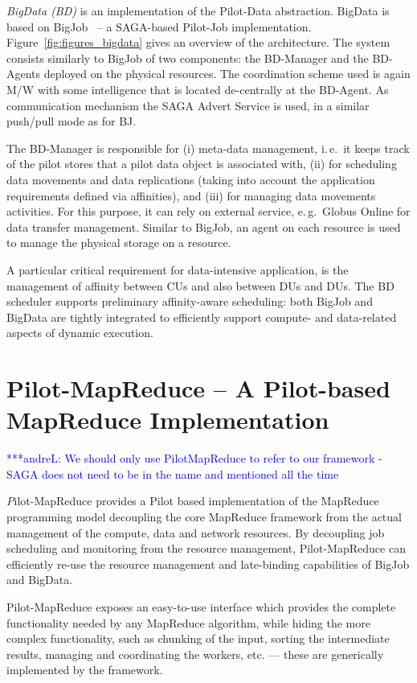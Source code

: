 \documentclass{acm_proc_article-sp}
\newcommand{\alnote}[1]{ {\textcolor{blue} { ***andreL: #1 }}}
\newcommand{\alnote}[1]{}
\newcommand{\pilot}{Pilot\xspace}
\newcommand{\pilotmapreduce}{Pilot-MapReduce\xspace}
\begin{document}
{\it BigData (BD)} is an implementation of the Pilot-Data abstraction.
BigData is based on BigJob~\cite{bigjob_web} -- a SAGA-based Pilot-Job
implementation. Figure~\ref{fig:figures_bigdata} gives an overview of the
architecture. The system consists similarly to BigJob of two components: the
BD-Manager and the BD-Agents deployed on the physical resources. The
coordination scheme used is again M/W with some intelligence that is located
de-centrally at the BD-Agent. As communication mechanism the SAGA Advert
Service is used, in a similar push/pull mode as for BJ.

The BD-Manager is responsible for (i) meta-data management, i.\,e.\ it
keeps track of the pilot stores that a pilot data object is associated
with, (ii) for scheduling data movements and data replications (taking
into account the application requirements defined via affinities), and
(iii) for managing data movements activities. For this purpose, it can rely
on external service, e.\,g.\ Globus Online for data transfer management.  
Similar to BigJob, an agent on each resource is used to manage the physical 
storage on a resource.  

A particular critical requirement for data-intensive application, is
the management of affinity between CUs and also between DUs and
DUs. The BD scheduler supports preliminary affinity-aware
scheduling: both BigJob and BigData are tightly integrated to
efficiently support compute- and data-related aspects of dynamic
execution.


\section{Pilot-MapReduce -- A Pilot-based MapReduce Implementation}
\alnote{We should only use PilotMapReduce to refer to our framework - SAGA does not need to be in the name and mentioned all the time}


{\emph \pilotmapreduce} provides a \pilot based implementation of the 
MapReduce programming model decoupling the core MapReduce framework from the 
actual management of the compute, data and network resources. By decoupling 
job scheduling and monitoring from the resource management, \pilotmapreduce 
can efficiently re-use the resource management and late-binding capabilities 
of BigJob and BigData.

\pilotmapreduce exposes an easy-to-use interface which provides the complete
functionality needed by any MapReduce algorithm, while hiding the more complex
functionality, such as chunking of the input, sorting the intermediate
results, managing and coordinating the workers, etc. — these are generically
implemented by the framework.
\end{document}
